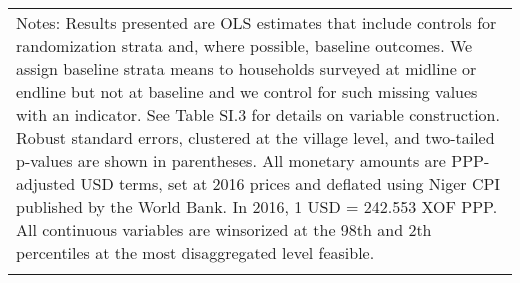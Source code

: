 \begin{longtable}{llcccccccccc}
\hline \hline                                                                                                                                                                                                                                                                                                                                                                                                                                                                                                                                                                                                                                                                                                                                                                                                                                                                             
\multicolumn{12}{p{\textwidth}}{{Notes: Results presented are OLS estimates that include controls for randomization strata and, where possible, baseline outcomes. We assign baseline strata means to households surveyed at midline or endline but not at baseline and we control for such missing values with an indicator. See Table SI.3 for details on variable construction. Robust standard errors, clustered at the village level, and two-tailed p-values are shown in parentheses. All monetary amounts are PPP-adjusted USD terms, set at 2016 prices and deflated using Niger CPI published by the World Bank. In 2016, 1 USD = 242.553 XOF PPP. All continuous variables are winsorized at the 98th and 2th percentiles at the most disaggregated level feasible. }} \\                                                                                                      
\multicolumn{12}{p{\textwidth}}{{}} \\                                                                                                                                                                                                                                                                                                                                                                                                                                                                                                                                                                                                                                                                                                                                                                                                                                                    

\end{longtable}

